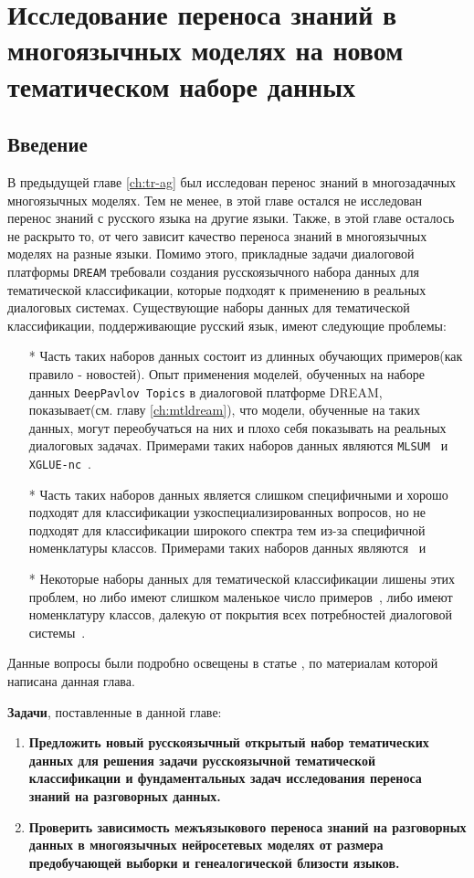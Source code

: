 \chapter{Исследование переноса знаний в многоязычных моделях на новом тематическом наборе данных}\label{ch:rutopics}
\section{Введение}
В предыдущей главе \ref{ch:tr-ag} был исследован перенос знаний в многозадачных многоязычных моделях. Тем не менее, в этой главе остался не исследован перенос знаний с русского языка на другие языки. Также, в этой главе осталось не раскрыто то, от чего зависит качество переноса знаний в многоязычных моделях на разные языки.
Помимо этого, прикладные задачи диалоговой платформы \texttt{DREAM} требовали создания русскоязычного набора данных для тематической классификации, которые подходят к применению в реальных диалоговых системах. Существующие наборы данных для тематической классификации, поддерживающие русский язык, имеют следующие проблемы:
\begin{itemize}
    \item[*] Часть таких наборов данных состоит из длинных обучающих примеров(как правило - новостей). Опыт применения моделей, обученных на наборе данных \texttt{DeepPavlov Topics} в диалоговой платформе DREAM, показывает(см. главу \ref{ch:mtldream}), что модели, обученные на таких данных, могут переобучаться на них и плохо себя показывать на реальных диалоговых задачах. Примерами таких наборов данных являются \texttt{MLSUM}~\cite{mlsum} и \texttt{XGLUE-nc}~\cite{xglue}.
    \item[*] Часть таких наборов данных является слишком специфичными и хорошо подходят для классификации узкоспециализированных вопросов, но не подходят для классификации широкого спектра тем из-за специфичной номенклатуры классов.  Примерами таких наборов данных являются~\cite{healthcare_facilities_reviews} и  ~\cite{pstu}
    \item[*] Некоторые наборы данных для тематической классификации лишены этих проблем, но либо имеют слишком маленькое число примеров~\cite{chatbotru}, либо имеют номенклатуру классов, далекую от покрытия всех потребностей диалоговой системы~\cite{massive}.
\end{itemize}
Данные вопросы были подробно освещены в статье \cite{rutopics}, по материалам которой написана данная глава. 

\textbf{Задачи}, поставленные в данной главе:
\begin{enumerate}
  \item \textbf{Предложить новый русскоязычный открытый набор тематических данных для решения задачи русскоязычной тематической классификации и фундаментальных задач исследования переноса знаний на разговорных данных.}
  \item \textbf{Проверить зависимость межъязыкового переноса знаний на разговорных данных в многоязычных нейросетевых моделях от размера предобучающей выборки и генеалогической близости языков.}
  \end{enumerate}

